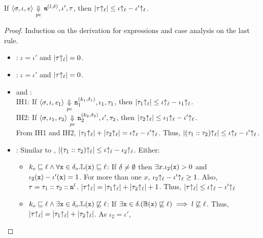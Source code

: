 \begin{myLemma}
\label{lem:app:lir:exptrl}
If $\langle \sigma, \iota, \mathit{e} \rangle {~\underset{\mathit{pc}}{\Downarrow}~} \emph{\texttt{n}}^{(l, \delta)},
\iota', \tau$, then  
$|\tau{\uparrow_\ell}| \leq \iota{\uparrow_\ell} - \iota'{\uparrow_\ell}$. 
\end{myLemma}
\begin{proof}
  Induction on the derivation for expressions and case analysis on the
  last rule. 
  \begin{itemize}[leftmargin=.5in]
  \item{}: $\iota = \iota'$ and $|\tau{\uparrow_\ell}| = 0$. 
  \item{}: $\iota = \iota'$ and $|\tau{\uparrow_\ell}| = 0$. 
  \item{} and :\\
    IH1: If $\langle \sigma, \iota, \mathit{e}_1 \rangle {~\underset{\mathit{pc}}{\Downarrow}~}  
    \texttt{n}_1^{(k_1, \delta_1)}, \iota_1, \tau_1$, then 
    $|\tau_1{\uparrow_\ell}| \leq \iota{\uparrow_\ell} - \iota_1{\uparrow_\ell}$. \\
    IH2: If $\langle \sigma, \iota_1, \mathit{e}_2 \rangle {~\underset{\mathit{pc}}{\Downarrow}~}  
    \texttt{n}_2^{(k_2, \delta_2)}, \iota', \tau_2$, then  
    $|\tau_2{\uparrow_\ell}| \leq \iota_1{\uparrow_\ell} - \iota'{\uparrow_\ell}$. \\
    From IH1 and IH2, $|\tau_1{\uparrow_\ell}| + |\tau_2{\uparrow_\ell}| = \iota{\uparrow_\ell} -
    \iota'{\uparrow_\ell}$. Thus, $|(\tau_1::\tau_2){\uparrow_\ell}| \leq \iota{\uparrow_\ell} -
    \iota'{\uparrow_\ell}$.
  \item{}: Similar to , $|(\tau_1::\tau_2){\uparrow_\ell}| \leq \iota{\uparrow_\ell} -
    \iota_2{\uparrow_\ell}$. Either:
    \begin{itemize}
      \item $k_o \sqsubseteq \ell \wedge \forall \texttt{x} \in
        \delta_o. \mathbb{L}(\texttt{x}) \sqsubseteq \ell$: If $\delta \neq
        \emptyset$ then $\exists x. \iota_2(\texttt{x}) > 0$ and $\iota_2(\texttt{x})
        -\iota'(\texttt{x}) =1$. For more than one $x$, $\iota_2{\uparrow_\ell} -
        \iota'{\uparrow_\ell} \geq 1$. Also, $\tau = \tau_1 :: \tau_2 ::
        \texttt{n}^l$. $|\tau{\uparrow_\ell}| = |\tau_1{\uparrow_\ell}| + |\tau_2{\uparrow_\ell}| +
        1$. Thus, $|\tau{\uparrow_\ell}| \leq \iota{\uparrow_\ell} - \iota'{\uparrow_\ell}$ 
      \item $k_o \sqsubseteq \ell \wedge \exists \texttt{x} \in
        \delta_o. \mathbb{L}(\texttt{x}) \not\sqsubseteq \ell$: If $\exists \texttt{x} \in
        \delta. (\mathbb{B}(\texttt{x}) \not\sqsubseteq \ell) \implies l
        \not\sqsubseteq \ell$. Thus, $|\tau{\uparrow_\ell}| =
        |\tau_1{\uparrow_\ell}| + |\tau_2{\uparrow_\ell}|$. As $\iota_2 = \iota'$,

\end{itemize}
\end{itemize}
\end{proof}
